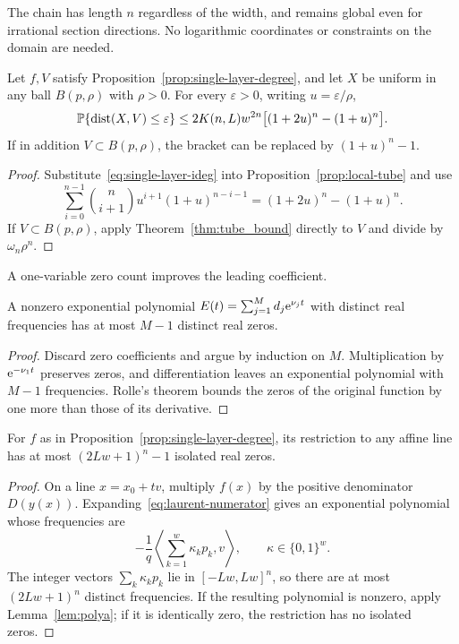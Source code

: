 The chain has length $n$ regardless of the width, and remains global even for irrational section directions. No logarithmic coordinates or constraints on the domain are needed.

\begin{theorem}\label{thm:prob_bound_single_layer}
Let $f,V$ satisfy Proposition~\ref{prop:single-layer-degree}, and let $X$ be uniform in any ball $B(p,\rho)$ with $\rho>0$. For every $\varepsilon>0$, writing $u=\varepsilon/\rho$,
\begin{equation}\label{eq:single-layer-prob-bound}
\operatorname*{\mathbb{P}}\{\operatorname{dist}(X,V)\le\varepsilon\}
\le 2K(n,L)w^{2n}\bigl[(1+2u)^n-(1+u)^n\bigr].
\end{equation}
If in addition $V\subset B(p,\rho)$, the bracket can be replaced by $(1+u)^n-1$.
\end{theorem}

\begin{proof}
Substitute~\eqref{eq:single-layer-ideg} into Proposition~\ref{prop:local-tube} and use
\[
\sum_{i=0}^{n-1}\binom n{i+1}u^{i+1}(1+u)^{n-i-1}
=(1+2u)^n-(1+u)^n.
\]
If $V\subset B(p,\rho)$, apply Theorem~\ref{thm:tube_bound} directly to $V$ and divide by $\omega_n\rho^n$.
\end{proof}

A one-variable zero count improves the leading coefficient.

\begin{lemma}\label{lem:polya}
A nonzero exponential polynomial $E(t)=\sum_{j=1}^M d_j\mathrm{e}^{\nu_jt}$ with distinct real frequencies has at most $M-1$ distinct real zeros.
\end{lemma}

\begin{proof}
Discard zero coefficients and argue by induction on $M$. Multiplication by $\mathrm{e}^{-\nu_1t}$ preserves zeros, and differentiation leaves an exponential polynomial with $M-1$ frequencies. Rolle's theorem bounds the zeros of the original function by one more than those of its derivative.
\end{proof}

\begin{lemma}\label{lem:line-intersection}
For $f$ as in Proposition~\ref{prop:single-layer-degree}, its restriction to any affine line has at most $(2Lw+1)^n-1$ isolated real zeros.
\end{lemma}

\begin{proof}
On a line $x=x_0+tv$, multiply $f(x)$ by the positive denominator $D(y(x))$. Expanding~\eqref{eq:laurent-numerator} gives an exponential polynomial whose frequencies are
\[
-\frac1q\left\langle\sum_{k=1}^w \kappa_kp_k,v\right\rangle,
\qquad \kappa\in\{0,1\}^w.
\]
The integer vectors $\sum_k\kappa_kp_k$ lie in $[-Lw,Lw]^n$, so there are at most $(2Lw+1)^n$ distinct frequencies. If the resulting polynomial is nonzero, apply Lemma~\ref{lem:polya}; if it is identically zero, the restriction has no isolated zeros.
\end{proof}


